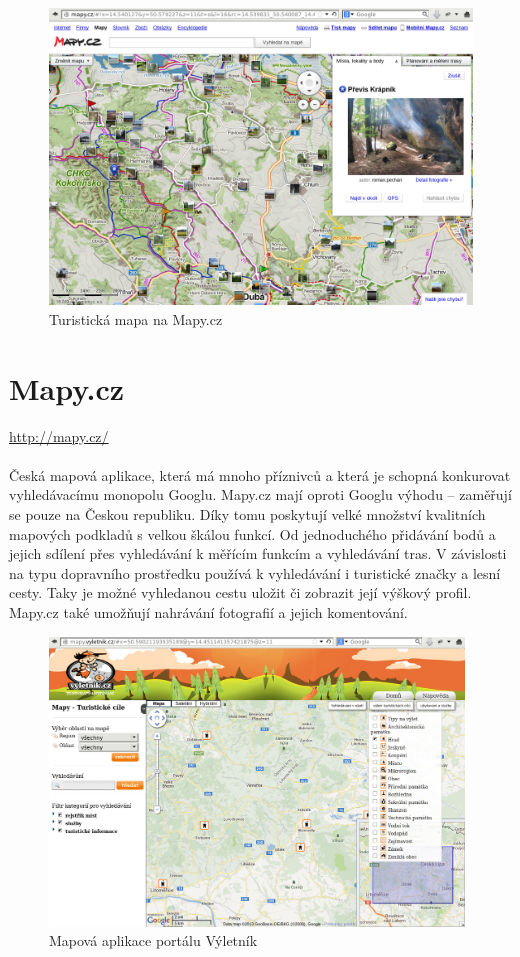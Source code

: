 \documentclass[11pt,a4paper,titlepage,oneside]{book}
\begin{document}
			\begin{figure}[!h]
				\begin{center}
					\includegraphics[width=12cm]{obrazky/mapycz.png}
					\caption{Turistická mapa na Mapy.cz}
				\end{center}
			\end{figure}

	\section{Mapy.cz}
		\url{http://mapy.cz/}
		\paragraph{} Česká mapová aplikace, která má mnoho příznivců a která je schopná konkurovat vyhledávacímu monopolu Googlu. Mapy.cz mají oproti Googlu výhodu -- zaměřují se pouze na Českou republiku. Díky tomu poskytují velké množství kvalitních mapových podkladů s velkou škálou funkcí. Od jednoduchého přidávání bodů a jejich sdílení přes vyhledávání k měřícím funkcím a vyhledávání tras. V závislosti na typu dopravního prostředku používá k vyhledávání i turistické značky a lesní cesty. Taky je možné vyhledanou cestu uložit či zobrazit její výškový profil. Mapy.cz také umožňují nahrávání fotografií a jejich komentování.

		\begin{figure}[!h]
			\begin{center}
				\includegraphics[width=11cm]{obrazky/vyletnik.png}
				\caption{Mapová aplikace portálu Výletník}
			\end{center}
		\end{figure}
\end{document}

